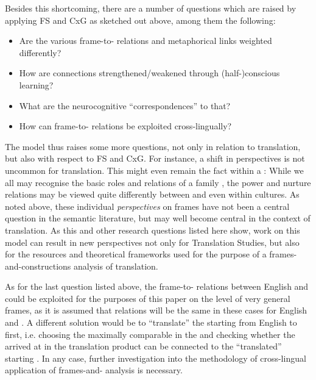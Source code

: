 \documentclass[output=paper]{LSP/langsci}
\begin{document}
Besides this shortcoming, there are a number of questions which are raised by applying FS and CxG  as sketched out above, among them the following:

\begin{itemize}
\item Are the various frame-to- relations and metaphorical links weighted differently?
\item \raggedright How are connections strengthened/weakened through (half-)conscious learning?
\item What are the neurocognitive ``correspondences'' to that?
\item How can frame-to- relations be exploited cross-lingually?
\end{itemize}

The model thus raises some more questions, not only in relation to translation, but also with respect to FS and CxG. For instance, a shift in perspectives is not uncommon for translation. This might even remain the fact within a : While we all may recognise the basic roles and relations of a family , the power and nurture relations may be viewed quite differently between and even within cultures. As noted above, these individual \textit{perspectives} on frames have not been a central question in the  semantic literature, but may well become central in the context of translation. As this and other research questions listed here show, work on this model can result in new perspectives not only for Translation Studies, but also for the resources and theoretical frameworks used for the purpose of a frames-and-constructions analysis of translation. 

As for the last question listed above, the frame-to- relations between English and  could be exploited for the purposes of this paper on the level of very general frames, as it is assumed that relations will be the same in these cases for English and . A different solution would be to ``translate'' the starting  from English to  first, i.e. choosing the maximally comparable  in the  and checking whether the  arrived at in the translation product can be connected to the ``translated'' starting . In any case, further investigation into the methodology of cross-lingual application of frames-and- analysis is necessary.
\end{document}
